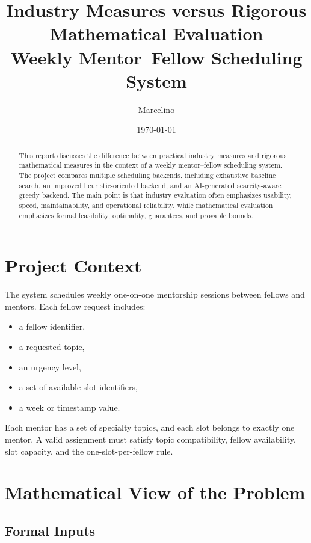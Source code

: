 \documentclass[12pt,a4paper]{article}
\title{\textbf{Industry Measures versus Rigorous Mathematical Evaluation}\\
\large Weekly Mentor--Fellow Scheduling System}
\author{Marcelino}
\date{\today}
\begin{document}
\maketitle

\begin{abstract}
This report discusses the difference between practical industry measures and rigorous mathematical measures in the context of a weekly mentor--fellow scheduling system. The project compares multiple scheduling backends, including exhaustive baseline search, an improved heuristic-oriented backend, and an AI-generated scarcity-aware greedy backend. The main point is that industry evaluation often emphasizes usability, speed, maintainability, and operational reliability, while mathematical evaluation emphasizes formal feasibility, optimality, guarantees, and provable bounds.
\end{abstract}

\tableofcontents
\newpage

\section{Project Context}

The system schedules weekly one-on-one mentorship sessions between fellows and mentors. Each fellow request includes:

\begin{itemize}[noitemsep]
    \item a fellow identifier,
    \item a requested topic,
    \item an urgency level,
    \item a set of available slot identifiers,
    \item a week or timestamp value.
\end{itemize}

Each mentor has a set of specialty topics, and each slot belongs to exactly one mentor. A valid assignment must satisfy topic compatibility, fellow availability, slot capacity, and the one-slot-per-fellow rule.

\section{Mathematical View of the Problem}

\subsection{Formal Inputs}
\end{document}
